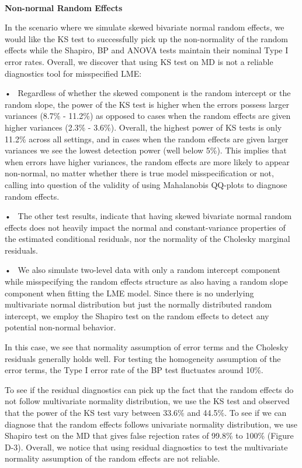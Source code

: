 \documentclass[12pt]{article}
\begin{document}
~

\textbf{Non-normal Random Effects}

In the scenario where we simulate skewed bivariate normal random
effects, we would like the KS test to successfully pick up the
non-normality of the random effects while the Shapiro, BP and ANOVA
tests maintain their nominal Type I error rates. Overall, we discover
that using KS test on MD is not a reliable diagnostics tool for
misspecified LME:

• ~Regardless of whether the skewed component is the random intercept or
the random slope, the power of the KS test is higher when the errors
possess larger variances (8.7\% - 11.2\%) as opposed to cases when the
random effects are given higher variances (2.3\% - 3.6\%). Overall, the
highest power of KS tests is only 11.2\% across all settings, and in
cases when the random effects are given larger variances we see the
lowest detection power (well below 5\%). This implies that when errors
have higher variances, the random effects are more likely to appear
non-normal, no matter whether there is true model misspecification or
not, calling into question of the validity of using Mahalanobis QQ-plots
to diagnose random effects.

• ~The other test results, indicate that having skewed bivariate normal
random effects does not heavily impact the normal and constant-variance
properties of the estimated conditional residuals, nor the normality of
the Cholesky marginal residuals.

• ~We also simulate two-level data with only a random intercept
component while misspecifying the random effects structure as also
having a random slope component when fitting the LME model. Since there
is no underlying multivariate normal distribution but just the normally
distributed random intercept, we employ the Shapiro test on the random
effects to detect any potential non-normal behavior.

In this case, we see that normality assumption of error terms and the
Cholesky residuals generally holds well. For testing the homogeneity
assumption of the error terms, the Type I error rate of the BP test
fluctuates around 10\%.

To see if the residual diagnostics can pick up the fact that the random
effects do not follow multivariate normality distribution, we use the KS
test and observed that the power of the KS test vary between 33.6\% and
44.5\%. To see if we can diagnose that the random effects follows
univariate normality distribution, we use Shapiro test on the MD that
gives false rejection rates of 99.8\% to 100\% (Figure D-3). Overall, we
notice that using residual diagnostics to test the multivariate
normality assumption of the random effects are not reliable.
\end{document}
